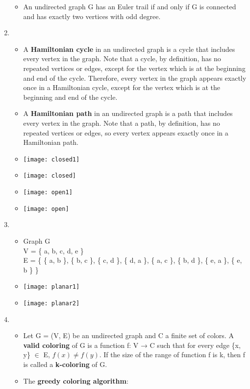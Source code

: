 \documentclass[12pt,a4paper]{article}
\begin{document}
\begin{enumerate}
\begin{itemize}
    \item An undirected graph G has an Euler trail if and only if G is connected and has exactly two vertices with odd degree.
  \end{itemize}
  \item {}
  \begin{itemize}
    \item A \textbf{Hamiltonian cycle} in an undirected graph is a cycle that includes every vertex in the graph. Note that a cycle, by definition, has no repeated vertices or edges, except for the vertex which is at the beginning and end of the cycle. Therefore, every vertex in the graph appears exactly once in a Hamiltonian cycle, except for the vertex which is at the beginning and end of the cycle.
    \item A \textbf{Hamiltonian path} in an undirected graph is a path that includes every vertex in the graph. Note that a path, by definition, has no repeated vertices or edges, so every vertex appears exactly once in a Hamiltonian path.
    \item[] \texttt{[image: closed1]}
    \item[] \texttt{[image: closed]}
    \item[] \texttt{[image: open1]} 
    \item[] \texttt{[image: open]}    
  \end{itemize}
  \item {}
  \begin{itemize}
    \item Graph G\\V = \{ a, b, c, d, e \} \\E = \{ \{ a, b \}, \{ b, c \}, \{ c, d \}, \{ d, a \}, \{ a, c \}, \{ b, d \}, \{ e, a \}, \{ e, b \} \}
    \item[] \texttt{[image: planar1]}
    \item[] \texttt{[image: planar2]}
  \end{itemize}
  \item {}
  \begin{itemize}
    \item Let G = (V, E) be an undirected graph and C a finite set of colors. A \textbf{valid coloring} of G is a function f: V → C such that for every edge \{x, y\} \(\in \) E, \(f(x) \neq f(y)\). If the size of the range of function f is k, then f is called a \textbf{k-coloring} of G.
    \item The \textbf{greedy coloring algorithm}:

\end{itemize}
\end{enumerate}
\end{document}
